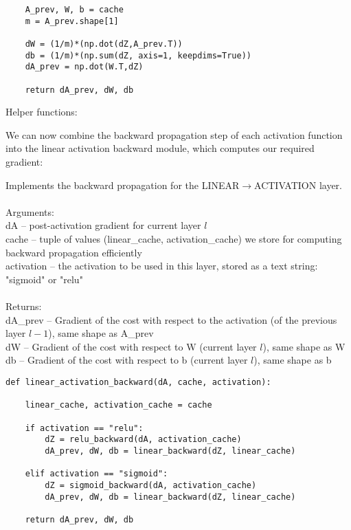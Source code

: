 \documentclass[a4paper]{article}
\begin{document}
\begin{enumerate}
\begin{alg}{}{}
\begin{verbatim}
    A_prev, W, b = cache
    m = A_prev.shape[1]

    dW = (1/m)*(np.dot(dZ,A_prev.T))
    db = (1/m)*(np.sum(dZ, axis=1, keepdims=True))
    dA_prev = np.dot(W.T,dZ)
    
    return dA_prev, dW, db
\end{verbatim}
\end{alg}

Helper functions: 
\begin{alg}{}{}
\end{alg}

We can now combine the backward propagation step of each activation function into the linear activation backward module, which computes our required gradient: 

\begin{alg}{}{} Implements the backward propagation for the LINEAR$\to$ACTIVATION layer.\\~\\
Arguments: \\
dA -- post-activation gradient for current layer $l$ \\
cache -- tuple of values (linear\_cache, activation\_cache) we store for computing backward propagation efficiently\\
activation -- the activation to be used in this layer, stored as a text string: "sigmoid" or "relu"\\~\\
Returns: \\
dA\_prev -- Gradient of the cost with respect to the activation (of the previous layer $l-1$), same shape as A\_prev\\
dW -- Gradient of the cost with respect to W (current layer $l$), same shape as W\\
db -- Gradient of the cost with respect to b (current layer $l$), same shape as b\\
\begin{verbatim}
def linear_activation_backward(dA, cache, activation):

    linear_cache, activation_cache = cache
    
    if activation == "relu":
        dZ = relu_backward(dA, activation_cache)
        dA_prev, dW, db = linear_backward(dZ, linear_cache)
        
    elif activation == "sigmoid":
        dZ = sigmoid_backward(dA, activation_cache)
        dA_prev, dW, db = linear_backward(dZ, linear_cache)
    
    return dA_prev, dW, db
\end{verbatim}
\end{alg}


\end{enumerate}
\end{document}
